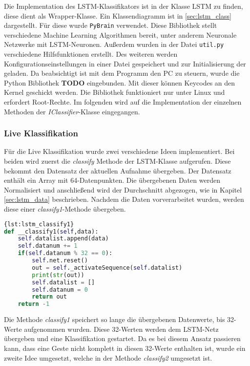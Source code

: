 Die Implementation des \ac{LSTM}-Klassifikators ist in der Klasse LSTM zu
finden, diese dient als Wrapper-Klasse. Ein Klassendiagramm ist in \autoref{sec:lstm_class} 
dargestellt.
Für diese wurde \texttt{PyBrain} \cite{schaul2010} verwendet. Diese Bibliothek
stellt verschiedene Machine Learning Algorithmen bereit, unter anderem Neuronale
Netzwerke mit \ac{LSTM}-Neuronen.
Außerdem wurden in der Datei \texttt{util.py} verschiedene Hilfsfunktionen
erstellt.
Des weiteren werden Konfigurationseinstellungen in einer Datei gespeichert und
zur Initialisierung der geladen.
Da beabsichtigt ist mit dem Programm den PC zu steuern, wurde die Python
Bibliothek \cite{Python-uinput}\textbf{TODO} eingebunden. Mit dieser können
Keycodes an den Kernel geschickt werden.
Die Bibliothek funktioniert nur unter Linux und erfordert Root-Rechte.
Im folgenden wird auf die Implementation der einzelnen Methoden der
\textit{IClassifier}-Klasse eingegangen.

\subsubsection*{Live Klassifikation}
Für die Live Klassifikation wurde zwei verschiedene Ideen implementiert. 
Bei beiden wird zuerst die \textit{classify} Methode der LSTM-Klasse 
aufgerufen. Diese bekommt den Datensatz der aktuellen Aufnahme übergeben. 
Der Datensatz enthält ein Array mit 64-Datenpunkten. Die übergebenen Daten werden 
Normalisiert und anschließend wird der Durchschnitt abgezogen, wie in Kapitel 
\autoref{sec:lstm_data} beschrieben. Nachdem die Daten vorverarbeitet wurden, 
werden diese einer \textit{classify1}-Methode übergeben. 
\begin{lstlisting}[language=Python,caption={Classify
Variante 1},label={lst:lstm_classify1}]{lst:lstm_classify1}
def __classify1(self,data):
	self.datalist.append(data)
	self.datanum += 1
	if(self.datanum % 32 == 0):
		self.net.reset()
		out = self._activateSequence(self.datalist)
		print(str(out))
		self.datalist = []
		self.datanum = 0
		return out
	return -1
\end{lstlisting}

Die Methode \textit{classify1} speichert so lange die übergebenen Datenwerte, 
bis 32-Werte aufgenommen wurden. Diese 32-Werten werden dem \ac{LSTM}-Netz 
übergeben und eine Klassifikation gestartet. Da es bei diesem Ansatz passieren kann, 
dass eine Geste nicht komplett in diesen 32-Werte enthalten ist, wurde ein zweite 
Idee umgesetzt, welche in der Methode \textit{classify2} umgesetzt ist.

